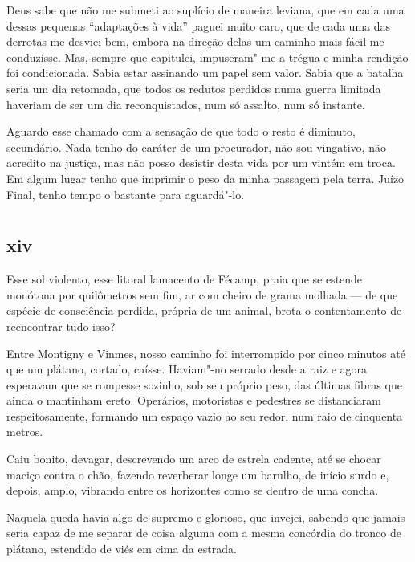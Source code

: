 Deus sabe que não me submeti ao suplício de maneira leviana, que em cada
uma dessas pequenas ``adaptações à vida'' paguei muito caro, que de
cada uma das derrotas me desviei bem, embora na direção delas um
caminho mais fácil me conduzisse. Mas, sempre que capitulei,
impuseram"-me a trégua e minha rendição foi condicionada. Sabia estar
assinando um papel sem valor. Sabia que a batalha seria um dia retomada,
que todos os redutos perdidos numa guerra limitada haveriam de ser um
dia reconquistados, num só assalto, num só instante.

Aguardo esse chamado com a sensação de que todo o resto é diminuto,
secundário. Nada tenho do caráter de um procurador, não sou vingativo,
não acredito na justiça, mas não posso desistir desta vida por um vintém
em troca. Em algum lugar tenho que imprimir o peso da minha passagem
pela terra. Juízo Final, tenho tempo o bastante para aguardá"-lo.

\chapter*{}
\section{xiv}


\noindent{}Esse sol violento, esse litoral lamacento de Fécamp, praia que se
estende monótona por quilômetros sem fim, ar com cheiro de grama
molhada --- de que espécie de consciência perdida, própria de um animal,
brota o contentamento de reencontrar tudo isso?

Entre Montigny e Vinmes, nosso caminho foi interrompido por cinco
minutos até que um plátano, cortado, caísse. Haviam"-no serrado desde a
raiz e agora esperavam que se rompesse sozinho, sob seu próprio peso,
das últimas fibras que ainda o mantinham ereto. Operários, motoristas e
pedestres se distanciaram respeitosamente, formando um espaço vazio ao
seu redor, num raio de cinquenta metros.

Caiu bonito, devagar, descrevendo um arco de estrela cadente, até se
chocar maciço contra o chão, fazendo reverberar longe um barulho, de
início surdo e, depois, amplo, vibrando entre os horizontes como se
dentro de uma concha.

Naquela queda havia algo de supremo e glorioso, que invejei, sabendo que
jamais seria capaz de me separar de coisa alguma com a mesma
concórdia do tronco de plátano, estendido de viés em cima da estrada.

